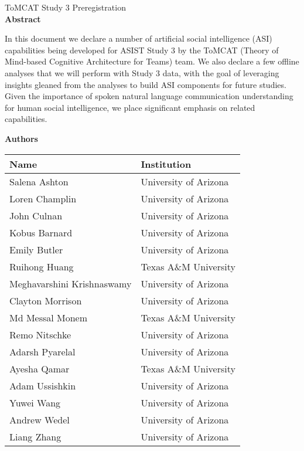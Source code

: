 \documentclass[oneside,9pt]{memoir}
\begin{document}
\thispagestyle{empty}
\begin{center}
    {\LARGE ToMCAT Study 3 Preregistration}\\
    \bigskip
    \textbf{Abstract}
\end{center}

    In this document we declare a number of artificial social intelligence
    (ASI) capabilities being developed for ASIST Study 3 by the ToMCAT (Theory
    of Mind-based Cognitive Architecture for Teams) team. We also declare a few
    offline analyses that we will perform with Study 3 data, with the goal of
    leveraging insights gleaned from the analyses to build ASI components for
    future studies. Given the importance of spoken natural language
    communication understanding for human social intelligence, we place
    significant emphasis on related capabilities.
\begin{center}

    \bigskip

    \textbf{Authors}

    \bigskip

    \begin{tabular}{ll}
        \toprule
        Name & Institution \\\midrule
        Salena Ashton & University of Arizona\\
        Loren Champlin & University of Arizona\\
        John Culnan & University of Arizona\\
        Kobus Barnard & University of Arizona\\
        Emily Butler & University of Arizona\\
        Ruihong Huang & Texas A\&M University \\
        Meghavarshini Krishnaswamy & University of Arizona\\
        Clayton Morrison & University of Arizona\\
        Md Messal Monem & Texas A\&M University \\
        Remo Nitschke & University of Arizona\\
        Adarsh Pyarelal & University of Arizona\\
        Ayesha Qamar & Texas A\&M University \\
        Adam Ussishkin& University of Arizona\\
        Yuwei Wang & University of Arizona\\
        Andrew Wedel & University of Arizona\\
        Liang Zhang & University of Arizona\\
        \bottomrule
    \end{tabular}
\end{center}
\end{document}
